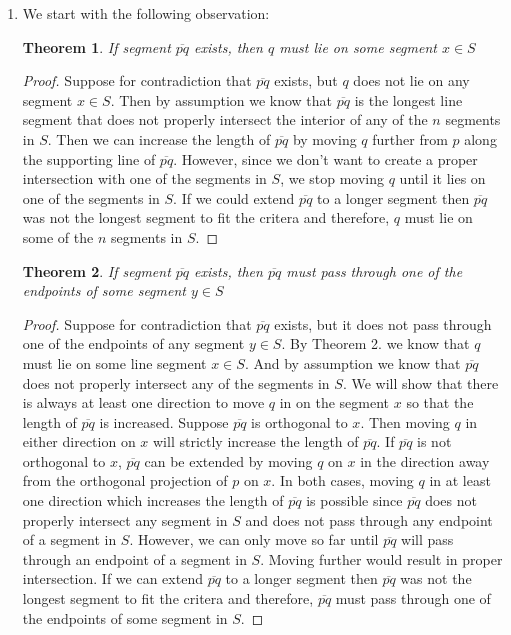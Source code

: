 \documentclass{article}
\newtheorem{theorem} {Theorem}
\begin{document}
  \begin{enumerate} 
    \item We start with the following observation:
    \vspace{0.3cm}
    \begin{theorem}
      If segment $\overline{pq}$ exists, then $q$ must lie on some segment $x \in S$
    \end{theorem}
    \begin{proof}
      Suppose for contradiction that $\overline{pq}$ exists, but $q$ does not lie on any segment $x \in S$.
      Then by assumption we know that $\overline{pq}$ is the longest line segment that does not properly intersect the interior of any of the $n$ segments in $S$.
      Then we can increase the length of $\overline{pq}$ by moving $q$ further from $p$ along the supporting line of $\overline{pq}$.
      However, since we don't want to create a proper intersection with one of the segments in $S$, we stop moving $q$ until it lies on one of the segments in $S$.
      If we could extend $\overline{pq}$ to a longer segment then $\overline{pq}$ was not the longest segment to fit the critera and therefore, $q$ must lie on some of the $n$ segments in $S$.
    \end{proof} 
    \vspace{0.3cm}
    \begin{theorem}
      If segment $\overline{pq}$ exists, then $\overline{pq}$ must pass through one of the endpoints of some segment $y \in S$
    \end{theorem}
    \begin{proof}
      Suppose for contradiction that $\overline{pq}$ exists, but it does not pass through one of the endpoints of any segment $y \in S$.
      By Theorem 2. we know that $q$ must lie on some line segment $x \in S$. And by assumption we know that $\overline{pq}$ does not properly intersect any of the segments in $S$.
      We will show that there is always at least one direction to move $q$ in on the segment $x$ so that the length of $\overline{pq}$ is increased.
      Suppose $\overline{pq}$ is orthogonal to $x$. Then moving $q$ in either direction on $x$ will strictly increase the length of $\overline{pq}$.
      If $\overline{pq}$ is not orthogonal to $x$, $\overline{pq}$ can be extended by moving $q$ on $x$ in the direction away from the orthogonal projection of $p$ on $x$.
      In both cases, moving $q$ in at least one direction which increases the length of $\overline{pq}$ is possible since $\overline{pq}$ does not properly intersect any segment in $S$ and does not pass through any endpoint of a segment in $S$.
      However, we can only move so far until $\overline{pq}$ will pass through an endpoint of a segment in $S$. Moving further would result in proper intersection.
      If we can extend $\overline{pq}$ to a longer segment then $\overline{pq}$ was not the longest segment to fit the critera and therefore, $\overline{pq}$ must pass through one of the endpoints of some segment in $S$.
    \end{proof}


\end{enumerate}
\end{document}
